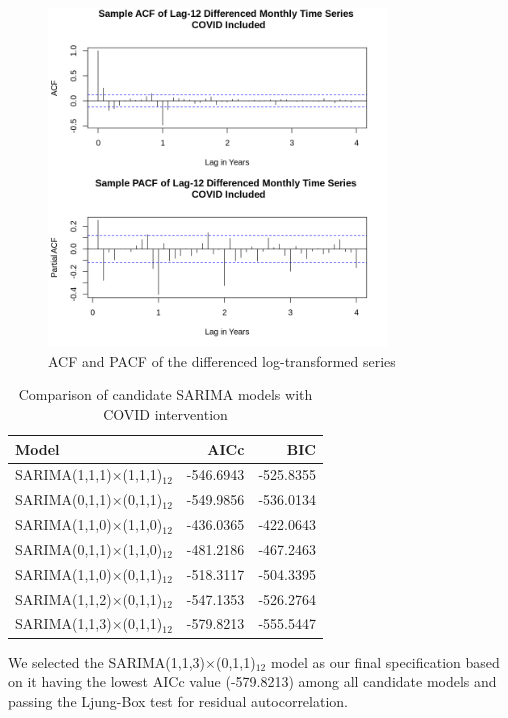 \documentclass[11pt]{article}
\begin{document}
\begin{figure}[!ht]
\centering
\includegraphics[width=0.8\textwidth]{diff_acf_pacf_full.png}
\caption{ACF and PACF of the differenced log-transformed series}
\label{fig:acf_pacf_diff}
\end{figure}

\begin{table}[!ht]
\centering
\caption{Comparison of candidate SARIMA models with COVID intervention}
\label{tab:intervention-models}
\begin{tabular}{lrr}
\hline
Model & AICc & BIC \\
\hline
SARIMA(1,1,1)×(1,1,1)$_{12}$ & -546.6943 & -525.8355 \\
SARIMA(0,1,1)×(0,1,1)$_{12}$ & -549.9856 & -536.0134 \\
SARIMA(1,1,0)×(1,1,0)$_{12}$ & -436.0365 & -422.0643 \\
SARIMA(0,1,1)×(1,1,0)$_{12}$ & -481.2186 & -467.2463 \\
SARIMA(1,1,0)×(0,1,1)$_{12}$ & -518.3117 & -504.3395 \\
SARIMA(1,1,2)×(0,1,1)$_{12}$ & -547.1353 & -526.2764 \\
SARIMA(1,1,3)×(0,1,1)$_{12}$ & -579.8213 & -555.5447 \\
\hline
\end{tabular}
\end{table}

We selected the SARIMA(1,1,3)$\times$(0,1,1)$_{12}$ model as our final specification based on it having the lowest AICc value (-579.8213) among all candidate models and passing the Ljung-Box test for residual autocorrelation.
\end{document}

